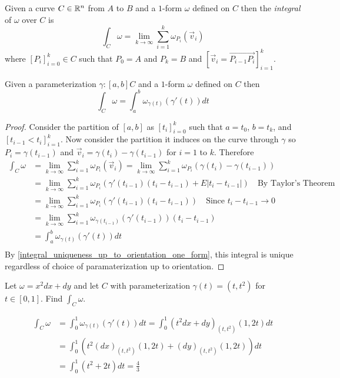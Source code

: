 \documentclass[notes]{subfiles}
\begin{document}
\begin{definition}
    Given a curve $C \in \mathbb{R}^n$ from $A$ to $B$ and a $1$-form $\omega$ defined on $C$ then the \textit{integral} of $\omega$ over $C$ is
    \[
        \int_C \omega = \lim_{k\to\infty} \sum_{i = 1}^k \omega_{P_i}(\vec{v}_i)
    \]
    where $[P_i]_{i = 0}^k \in C$ such that $P_0 = A$ and $P_k = B$ and $[\vec{v}_i = \overrightarrow{P_{i - 1}P_i}]_{i = 1}^k$.
\end{definition}

\begin{theorem}
    Given a parameterization $\gamma\colon [a, b] C$ and a $1$-form $\omega$ defined on $C$ then
    \[
        \int_C \omega = \int_a^b \omega_{\gamma(t)}(\gamma'(t))dt
    \]
\end{theorem}
\begin{proof}
    Consider the partition of $[a, b]$ as $[t_i]_{i = 0}^k$ such that $a = t_0$, $b = t_k$, and $[t_{i - 1} < t_i]_{i = 1}^k$. Now consider the partition it induces on the curve through $\gamma$ so $P_i = \gamma(t_{i - 1})$ and $\vec{v}_i = \gamma(t_i) - \gamma(t_{i - 1})$ for $i = 1$ to $k$. Therefore
    \begin{align*}
        \int_C \omega
        &= \lim_{k\to\infty} \sum_{i = 1}^k \omega_{P_i}(\vec{v}_i)
        = \lim_{k\to\infty} \sum_{i = 1}^k \omega_{P_i}(\gamma(t_i) - \gamma(t_{i - 1})) \\
        &= \lim_{k\to\infty} \sum_{i = 1}^k \omega_{P_i}(\gamma'(t_{i - 1})(t_i - t_{i -1}) + E|t_i - t_{i - 1}|) \quad \text{By Taylor's Theorem} \\
        &= \lim_{k\to\infty} \sum_{i = 1}^k \omega_{P_i}(\gamma'(t_{i - 1})(t_i - t_{i -1})) \quad \text{Since $t_i - t_{i - 1} \to 0$} \\
        &= \lim_{k\to\infty} \sum_{i = 1}^k \omega_{\gamma(t_{i - 1})}(\gamma'(t_{i - 1}))(t_i - t_{i -1}) \\
        &= \int_a^b \omega_{\gamma(t)}(\gamma'(t))dt \\
    \end{align*}
    By \cref{integral_uniqueness_up_to_orientation_one_form}, this integral is unique regardless of choice of paramaterization up to orientation.
\end{proof}

\begin{exercise}
    Let $\omega = x^2dx + dy$ and let $C$ with parameterization $\gamma(t) = (t, t^2)$ for $t \in [0, 1]$. Find $\int_C \omega$.
\end{exercise}
\begin{solution}
    \begin{align*}
        \int_C \omega
        &= \int_0^1 \omega_{\gamma(t)}(\gamma'(t))dt
        = \int_0^1 (t^2dx + dy)_{(t, t^2)}(1, 2t)dt \\
        &= \int_0^1 (t^2(dx)_{(t, t^2)}(1,2 t) + (dy)_{(t, t^2)}(1, 2t))dt \\
        &= \int_0^1 (t^2 + 2t)dt
        = \frac{4}{3}
    \end{align*}
\end{solution}
\end{document}
